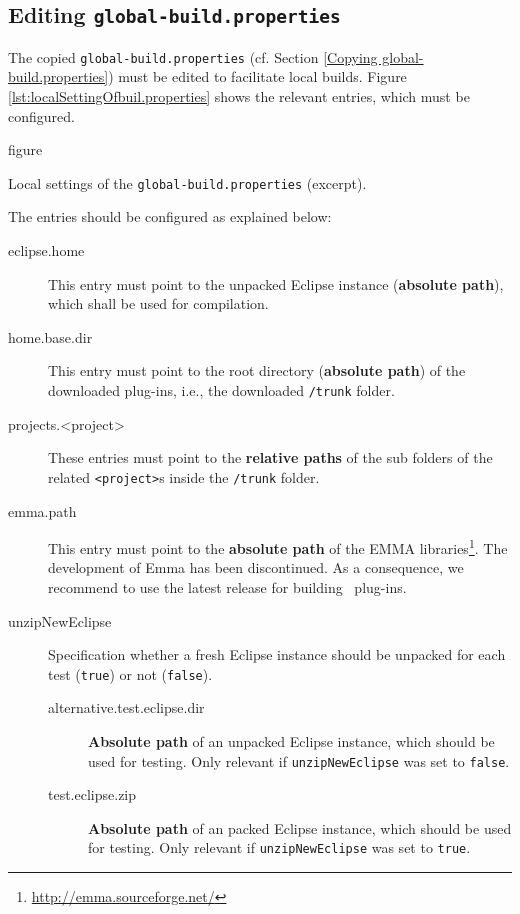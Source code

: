 \subsection{Editing \texttt{global-build.properties}}
\label{sec:global-build.properties}
The copied \texttt{global-build.properties} (cf. Section \vref{Copying global-build.properties}) must be edited to facilitate local builds. Figure \vref{lst:localSettingOfbuil.properties} shows the relevant entries, which must be configured.

\begin{nofloat}{figure}
	\centering
	
	\caption[Local settings of the \texttt{global-build.properties}]{Local settings of the \texttt{global-build.properties} (excerpt).}
	\label{lst:localSettingOfbuil.properties}
\end{nofloat}

The entries should be configured as explained below:
\begin{description}
	\item[eclipse.home] $ $\\
		This entry must point to the unpacked Eclipse instance (\textbf{absolute path}), which shall be used for compilation.
	\item[home.base.dir] $ $\\
		This entry must point to the root directory (\textbf{absolute path}) of the downloaded plug-ins, i.e., the downloaded \texttt{/trunk} folder.
	\item[projects.<project>] $ $\\
		These entries must point to the \textbf{relative paths} of the sub folders of the related \texttt{<project>}s inside the \texttt{/trunk} folder.
	\item[emma.path] $ $\\
		This entry must point to the \textbf{absolute path} of the EMMA libraries\footnote{\url{http://emma.sourceforge.net/}}. The development of Emma has been discontinued. As a consequence, we recommend to use the latest release for building \EASy\ plug-ins.
	\newpage
	\item[unzipNewEclipse] $ $\\
		Specification whether a fresh Eclipse instance should be unpacked for each test (\texttt{true}) or not (\texttt{false}).	
	\begin{description}
		\item[alternative.test.eclipse.dir] $ $\\
			\textbf{Absolute path} of an unpacked Eclipse instance, which should be used for testing. Only relevant if \texttt{unzipNewEclipse} was set to \texttt{false}.
	\item[test.eclipse.zip] $ $\\
			\textbf{Absolute path} of an packed Eclipse instance, which should be used for testing. Only relevant if \texttt{unzipNewEclipse} was set to \texttt{true}.
	\end{description}
\end{description}

